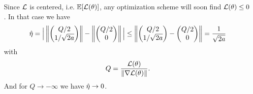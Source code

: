 \begin{remark}
	Since \(\mathcal{L}\) is centered, i.e. \(\mathbb{E}[\mathcal{L}(\theta)]\), any optimization
	scheme will soon find \(\mathcal{L}(\theta)\le 0\). In that case we have
	\begin{align*}
		\hat{\eta} =
		\Big| \left\|\begin{pmatrix}
			Q/2\\ 1/\sqrt{2a}	
		\end{pmatrix}\right\|
		- \left\|\begin{pmatrix}
			Q/2 \\ 0
		\end{pmatrix}\right\|
		\Big|	
		\le \left\|\begin{pmatrix}
			Q/2\\ 1/\sqrt{2a}
		\end{pmatrix} - \begin{pmatrix}
			Q/2 \\ 0
		\end{pmatrix}
		\right\| = \frac1{\sqrt{2a}}
	\end{align*}
	with
	\begin{align*}
		Q = \frac{\mathcal{L}(\theta)}{\|\nabla\mathcal{L}(\theta)\|}.
	\end{align*}
	And for \(Q\to -\infty\) we have \(\hat{\eta}\to 0\).
\end{remark}

